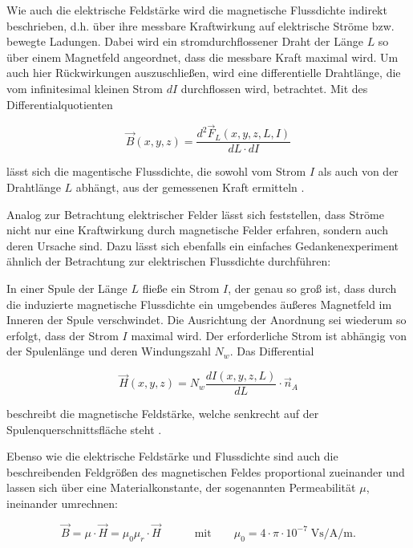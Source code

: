 Wie auch die elektrische Feldstärke wird die magnetische Flussdichte indirekt beschrieben, d.h. über ihre messbare Kraftwirkung auf elektrische Ströme bzw. bewegte Ladungen. Dabei wird ein stromdurchflossener Draht der Länge $L$ so über einem Magnetfeld angeordnet, dass die messbare Kraft maximal wird. Um auch hier Rückwirkungen auszuschließen, wird eine differentielle Drahtlänge, die vom infinitesimal kleinen Strom $dI$ durchflossen wird, betrachtet. Mit des Differentialquotienten

\begin{equation}
    \vec B(x,y,z) = \frac{d^2 \vec F_L(x,y,z,L,I)}{dL \cdot dI}
\end{equation}

lässt sich die magentische Flussdichte, die sowohl vom Strom $I$ als auch von der Drahtlänge $L$ abhängt, aus der gemessenen Kraft ermitteln \cite{EM_Schirmung}. 
\par
\vspace{\linespace}
Analog zur Betrachtung elektrischer Felder lässt sich feststellen, dass Ströme nicht nur eine Kraftwirkung durch magnetische Felder erfahren, sondern auch deren Ursache sind. Dazu lässt sich ebenfalls ein einfaches Gedankenexperiment ähnlich der Betrachtung zur elektrischen Flussdichte durchführen: 
\par
\vspace{\linespace}
In einer Spule der Länge $L$ fließe ein Strom $I$, der genau so groß ist, dass durch die induzierte magnetische Flussdichte ein umgebendes äußeres Magnetfeld im Inneren der Spule verschwindet. Die Ausrichtung der Anordnung sei wiederum so erfolgt, dass der Strom $I$ maximal wird. Der erforderliche Strom ist abhängig von der Spulenlänge und deren Windungszahl $N_w$. Das Differential

\begin{equation}
    \vec H(x,y,z) = N_w \frac{dI(x,y,z,L)}{dL} \cdot \vec n_A
\end{equation}

beschreibt die magnetische Feldstärke, welche senkrecht auf der Spulenquerschnittsfläche steht \cite{EM_Schirmung}. 
\par
\vspace{\linespace}
Ebenso wie die elektrische Feldstärke und Flussdichte sind auch die beschreibenden Feldgrößen des magnetischen Feldes proportional zueinander und lassen sich über eine Materialkonstante, der sogenannten Permeabilität $\mu$, ineinander umrechnen:

\begin{equation}
    \vec B = \mu \cdot \vec H = \mu_0 \mu_r \cdot \vec H \qquad \quad \text{mit} \qquad \mu_0 = 4\cdot \pi \cdot 10^{-7} \; \si{\volt\second\per\ampere\per\meter}.
    \label{eq:2_Materialgleichung_magnetisches_Feld}
\end{equation}

